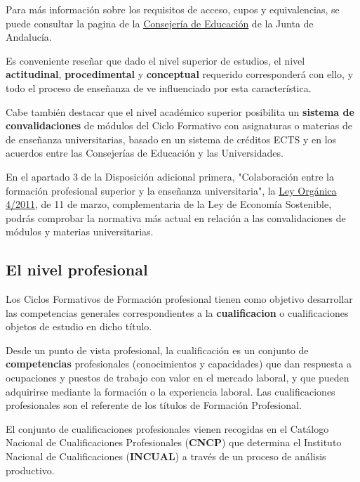 Para más información sobre los requisitos de acceso, cupos y equivalencias, se puede consultar la pagina de la \href{https://www.juntadeandalucia.es/educacion/portals/web/formacion-profesional-andaluza/quiero-formarme/ensenanzas/fp-grado-superior/requisitos}{Consejería de Educación} de la Junta de Andalucía.

Es conveniente reseñar que dado el nivel superior de estudios, el nivel \textbf{\gls{actitudinal}}, \textbf{\gls{procedimental}} y \textbf{\gls{conceptual}} requerido corresponderá con ello, y todo el proceso de enseñanza de ve influenciado por esta característica.

Cabe también destacar que el nivel académico superior posibilita un \textbf{sistema de convalidaciones} de módulos del Ciclo Formativo con asignaturas o materias de de enseñanza universitarias, basado en un sistema de créditos ECTS y en los acuerdos entre las Consejerías de Educación y las Universidades.

En el apartado 3 de la Disposición adicional primera, "Colaboración entre la formación profesional superior y la enseñanza universitaria", la \href{https://www.boe.es/boe/dias/2011/03/12/pdfs/BOE-A-2011-4551.pdf}{Ley Orgánica 4/2011}, de 11 de marzo, complementaria de la Ley de Economía Sostenible, podrás comprobar la normativa más actual en relación a las convalidaciones de módulos y materias universitarias.

\subsection{El nivel profesional}
Los Ciclos Formativos de Formación profesional tienen como objetivo desarrollar las competencias generales correspondientes a la \textbf{\gls{cualificacion}} o cualificaciones objetos de estudio en dicho título.

Desde un punto de vista profesional, la cualificación es un conjunto de \textbf{\gls{competencias}} profesionales (conocimientos y capacidades) que dan respuesta a ocupaciones y puestos de trabajo con valor en el mercado laboral, y que pueden adquirirse mediante la formación o la experiencia laboral. Las cualificaciones profesionales son el referente de los títulos de Formación Profesional.

El conjunto de cualificaciones profesionales vienen recogidas en el Catálogo Nacional de Cualificaciones Profesionales (\textbf{CNCP}) que determina el Instituto Nacional de Cualificaciones (\textbf{INCUAL}) a través de un proceso de análisis productivo.


